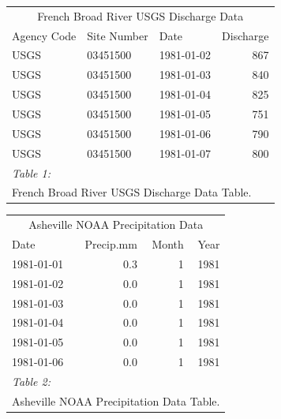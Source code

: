 \documentclass[
]{article}
\begin{document}
\newpage
\begin{table}
\centering
\begin{tabular}[t]{l|l|l|r}
\hline
\multicolumn{4}{c}{French Broad River USGS Discharge Data} \\
\cline{1-4}
Agency Code & Site Number & Date & Discharge\\
\hline
USGS & 03451500 & 1981-01-02 & 867\\
\hline
USGS & 03451500 & 1981-01-03 & 840\\
\hline
USGS & 03451500 & 1981-01-04 & 825\\
\hline
USGS & 03451500 & 1981-01-05 & 751\\
\hline
USGS & 03451500 & 1981-01-06 & 790\\
\hline
USGS & 03451500 & 1981-01-07 & 800\\
\hline
\multicolumn{4}{l}{\rule{0pt}{1em}\textit{Table 1: }}\\
\multicolumn{4}{l}{\rule{0pt}{1em}French Broad River USGS Discharge Data Table.}\\
\end{tabular}
\end{table}

\begin{table}
\centering
\begin{tabular}[t]{l|r|r|r}
\hline
\multicolumn{4}{c}{Asheville NOAA Precipitation Data} \\
\cline{1-4}
Date & Precip.mm & Month & Year\\
\hline
1981-01-01 & 0.3 & 1 & 1981\\
\hline
1981-01-02 & 0.0 & 1 & 1981\\
\hline
1981-01-03 & 0.0 & 1 & 1981\\
\hline
1981-01-04 & 0.0 & 1 & 1981\\
\hline
1981-01-05 & 0.0 & 1 & 1981\\
\hline
1981-01-06 & 0.0 & 1 & 1981\\
\hline
\multicolumn{4}{l}{\rule{0pt}{1em}\textit{Table 2: }}\\
\multicolumn{4}{l}{\rule{0pt}{1em}Asheville NOAA Precipitation Data Table.}\\
\end{tabular}
\end{table}
\end{document}
